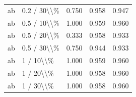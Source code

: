 \begin{table}[!h]
\begin{tabular}[t]{llccc}
\addlinespace
ab & 0.2 / 30\textbackslash{}\textbackslash{}\% & 0.750 & 0.958 & 0.947\\
ab & 0.5 / 10\textbackslash{}\textbackslash{}\% & 1.000 & 0.959 & 0.960\\
ab & 0.5 / 20\textbackslash{}\textbackslash{}\% & 0.333 & 0.958 & 0.933\\
ab & 0.5 / 30\textbackslash{}\textbackslash{}\% & 0.750 & 0.944 & 0.933\\
ab & 1 / 10\textbackslash{}\textbackslash{}\% & 1.000 & 0.959 & 0.960\\
\addlinespace
ab & 1 / 20\textbackslash{}\textbackslash{}\% & 1.000 & 0.958 & 0.960\\
ab & 1 / 30\textbackslash{}\textbackslash{}\% & 1.000 & 0.958 & 0.960\\
\bottomrule
\end{tabular}
\end{table}
